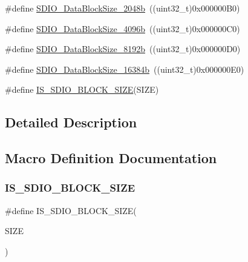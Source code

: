 \begin{DoxyCompactItemize}
\item 
\#define \hyperlink{group___s_d_i_o___data___block___size_ga41eb937621c7ffcf2688c6bc0ea31464}{S\+D\+I\+O\+\_\+\+Data\+Block\+Size\+\_\+2048b}~((uint32\+\_\+t)0x000000\+B0)
\item 
\#define \hyperlink{group___s_d_i_o___data___block___size_ga360411488abdbaf9eee9b99fca793f79}{S\+D\+I\+O\+\_\+\+Data\+Block\+Size\+\_\+4096b}~((uint32\+\_\+t)0x000000\+C0)
\item 
\#define \hyperlink{group___s_d_i_o___data___block___size_gaf61913f3eff52c0f728db9ffbdaca7d2}{S\+D\+I\+O\+\_\+\+Data\+Block\+Size\+\_\+8192b}~((uint32\+\_\+t)0x000000\+D0)
\item 
\#define \hyperlink{group___s_d_i_o___data___block___size_gae80bc49dbed677f7087d523c31fe10ae}{S\+D\+I\+O\+\_\+\+Data\+Block\+Size\+\_\+16384b}~((uint32\+\_\+t)0x000000\+E0)
\item 
\#define \hyperlink{group___s_d_i_o___data___block___size_ga25ce8d64134659c479d61aa681761948}{I\+S\+\_\+\+S\+D\+I\+O\+\_\+\+B\+L\+O\+C\+K\+\_\+\+S\+I\+ZE}(S\+I\+ZE)
\end{DoxyCompactItemize}


\subsection{Detailed Description}


\subsection{Macro Definition Documentation}
\mbox{\label{group___s_d_i_o___data___block___size_ga25ce8d64134659c479d61aa681761948}} 
\subsubsection{\texorpdfstring{I\+S\+\_\+\+S\+D\+I\+O\+\_\+\+B\+L\+O\+C\+K\+\_\+\+S\+I\+ZE}{IS\_SDIO\_BLOCK\_SIZE}}
{\footnotesize\ttfamily \#define I\+S\+\_\+\+S\+D\+I\+O\+\_\+\+B\+L\+O\+C\+K\+\_\+\+S\+I\+ZE(\begin{DoxyParamCaption}\item[{}]{S\+I\+ZE }\end{DoxyParamCaption})}

